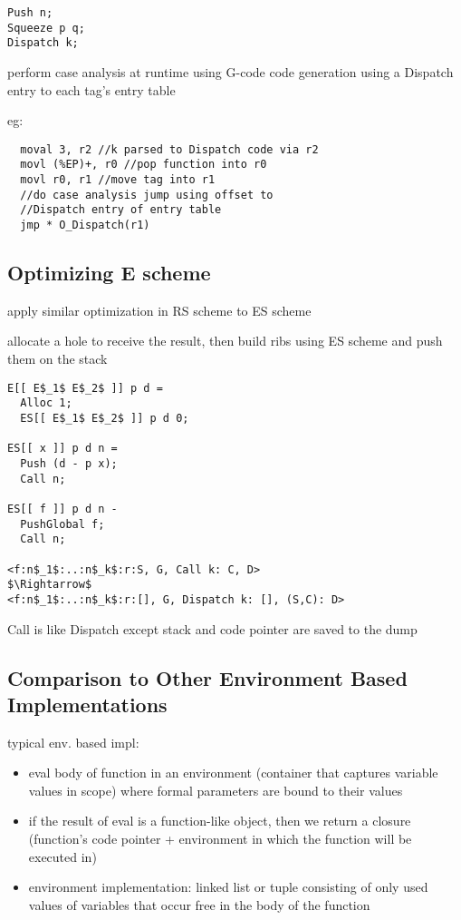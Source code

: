 \documentclass[8pt]{extarticle}
\begin{document}
\begin{multicols*}{2}
\begin{lstlisting}
Push n;
Squeeze p q;
Dispatch k;
\end{lstlisting}

perform case analysis at runtime using G-code code generation using a Dispatch entry to each tag's entry table

eg:
\begin{lstlisting}
  moval 3, r2 //k parsed to Dispatch code via r2
  movl (%EP)+, r0 //pop function into r0
  movl r0, r1 //move tag into r1
  //do case analysis jump using offset to
  //Dispatch entry of entry table
  jmp * O_Dispatch(r1) 
\end{lstlisting}

\subsection{Optimizing E scheme}

apply similar optimization in RS scheme to ES scheme

allocate a hole to receive the result, then build ribs using ES scheme and push them on the stack

\begin{lstlisting}
E[[ E$_1$ E$_2$ ]] p d =
  Alloc 1;
  ES[[ E$_1$ E$_2$ ]] p d 0;

ES[[ x ]] p d n =
  Push (d - p x);
  Call n;

ES[[ f ]] p d n -
  PushGlobal f;
  Call n;

<f:n$_1$:..:n$_k$:r:S, G, Call k: C, D>
$\Rightarrow$
<f:n$_1$:..:n$_k$:r:[], G, Dispatch k: [], (S,C): D>
\end{lstlisting}

Call is like Dispatch except stack and code pointer are saved to the dump


\subsection{Comparison to Other Environment Based Implementations}

typical env. based impl:
\begin{itemize}
\item eval body of function in an environment (container that captures variable values in scope) where formal parameters are bound to their values
\item if the result of eval is a function-like object, then we return a closure (function's code pointer + environment in which the function will be executed in)
\item environment implementation: linked list or tuple consisting of only used values of variables that occur free in the body of the function
\end{itemize}


\end{multicols*}
\end{document}
